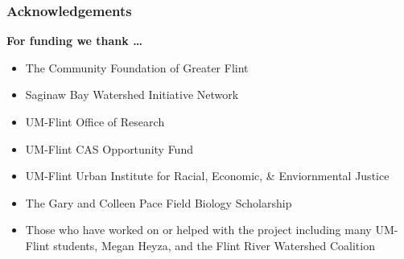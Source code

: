 \documentclass[10pt]{beamer}
\newcommand{\iast}{\item[$\circledast$]}
\begin{document}

\begin{frame}
    \frametitle{Acknowledgements} %
    \begin{center}
      \textbf{\Large For funding we thank \dots}
    \end{center}
    \begin{itemize}
      \iast The Community Foundation of Greater Flint
      \iast Saginaw Bay Watershed Initiative Network
      \iast UM-Flint Office of Research
      \iast UM-Flint CAS Opportunity Fund
      \iast UM-Flint Urban Institute for Racial, Economic, \& Enviornmental Justice
      \iast The Gary and Colleen Pace Field Biology Scholarship
      \iast Those who have worked on or helped with the project including many UM-Flint students, 
      Megan Heyza, and the Flint River Watershed Coalition
    \end{itemize}
\end{frame}



\end{document}

